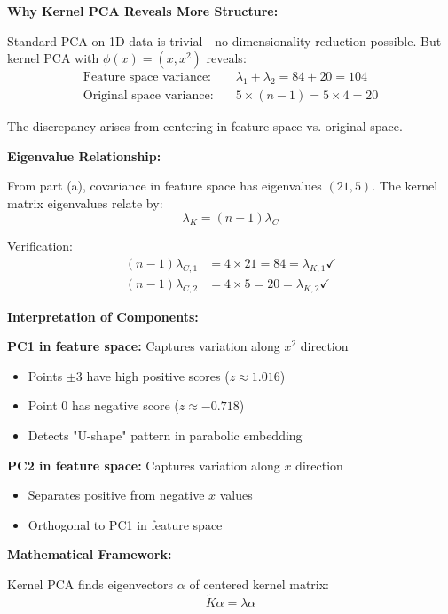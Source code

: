 \documentclass[12pt]{article}
\begin{document}
\begin{explanation}

\textbf{Why Kernel PCA Reveals More Structure:}

Standard PCA on 1D data is trivial - no dimensionality reduction possible. But kernel PCA with $\phi(x) = (x, x^2)$ reveals:
\begin{align*}
\text{Feature space variance:} &\quad \lambda_1 + \lambda_2 = 84 + 20 = 104 \\
\text{Original space variance:} &\quad 5 \times (n-1) = 5 \times 4 = 20
\end{align*}

The discrepancy arises from centering in feature space vs. original space.

\textbf{Eigenvalue Relationship:}

From part (a), covariance in feature space has eigenvalues $(21, 5)$. The kernel matrix eigenvalues relate by:
\[
\lambda_K = (n-1) \lambda_C
\]

Verification:
\begin{align*}
(n-1)\lambda_{C,1} &= 4 \times 21 = 84 = \lambda_{K,1} \checkmark \\
(n-1)\lambda_{C,2} &= 4 \times 5 = 20 = \lambda_{K,2} \checkmark
\end{align*}

\textbf{Interpretation of Components:}

\textbf{PC1 in feature space:} Captures variation along $x^2$ direction
\begin{itemize}
    \item Points $\pm 3$ have high positive scores ($z \approx 1.016$)
    \item Point $0$ has negative score ($z \approx -0.718$)
    \item Detects "U-shape" pattern in parabolic embedding
\end{itemize}

\textbf{PC2 in feature space:} Captures variation along $x$ direction
\begin{itemize}
    \item Separates positive from negative $x$ values
    \item Orthogonal to PC1 in feature space
\end{itemize}

\textbf{Mathematical Framework:}

Kernel PCA finds eigenvectors $\alpha$ of centered kernel matrix:
\[
\tilde{K}\alpha = \lambda \alpha
\]


\end{explanation}
\end{document}
